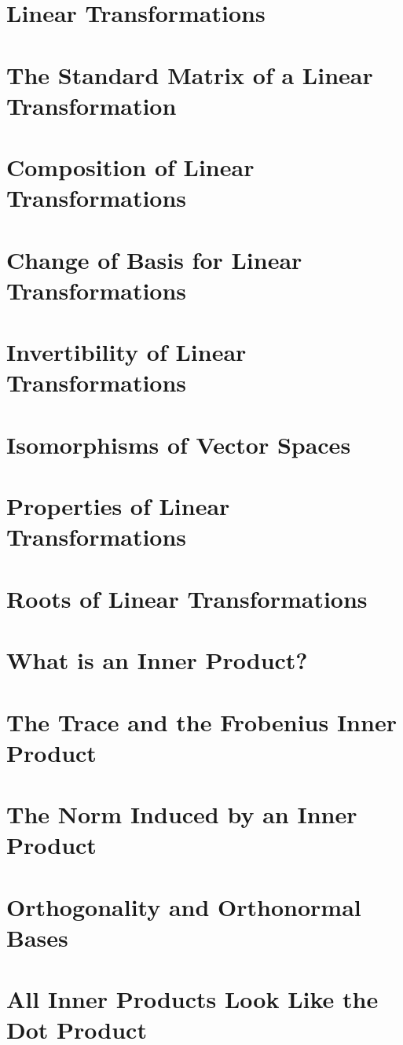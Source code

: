 \documentclass{article}
\begin{document}
\section{Linear Transformations}
\section{The Standard Matrix of a Linear Transformation}
\section{Composition of Linear Transformations}
\section{Change of Basis for Linear Transformations}
\section{Invertibility of Linear Transformations}
\section{Isomorphisms of Vector Spaces}
\section{Properties of Linear Transformations}
\section{Roots of Linear Transformations}
\section{What is an Inner Product?}
\section{The Trace and the Frobenius Inner Product}
\section{The Norm Induced by an Inner Product}
\section{Orthogonality and Orthonormal Bases}
\section{All Inner Products Look Like the Dot Product}
\end{document}
